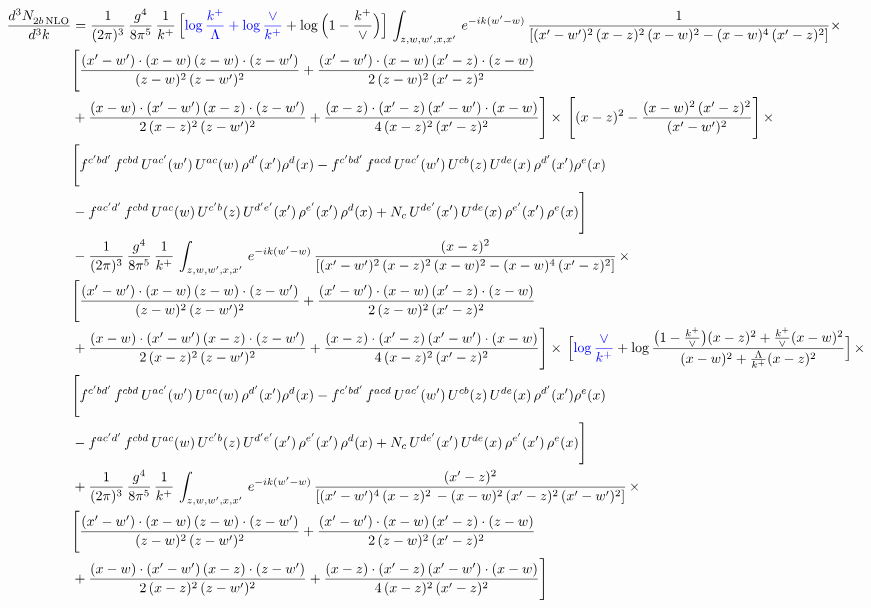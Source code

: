 \documentclass[9pt]{article}
\numberwithin{equation}{section}
\begin{document}
\begin{align} 
    \frac{d^{3}N_{2b\,\rm NLO}^{\rm}}{d^{3}k}  & = \frac{1}{(2\pi)^{3}}\, \frac{g^{4}}{8\pi^{5}}\,\frac{1}{k^{+}}\,\Big[{\color{blue}\log\frac{k^{+}}{\Lambda}+\log\frac{\vee}{k^{+}}}+\log\Big(1-\frac{k^{+}}{\vee}\Big)\Big]\,\int_{z,w,w^{\prime},x,x'}\, e^{-ik(w^{\prime}-w)}\, \frac{1}{\left[(x'-w')^{2}\,(x-z)^{2}\,(x-w)^{2} - (x-w)^{4}\, (x'-z)^{2}\right]} \times\notag \\ & \Bigg[\frac{(x'-w')\cdot (x-w)\, (z-w)\cdot (z-w')}{(z-w)^{2}\, (z-w')^{2}}+\frac{(x'-w')\cdot (x-w)\, (x'-z)\cdot (z-w)}{2\, (z-w)^{2}\, (x'-z)^{2}}\notag \\ & +\frac{(x-w)\cdot (x'-w')\, (x-z)\cdot (z-w')}{2\, (x-z)^{2}\, (z-w')^{2}}+\frac{(x-z)\cdot (x'-z)\, (x'-w')\cdot (x-w)}{4\, (x-z)^{2}\, (x'-z)^{2}}\Bigg] \times\,\Bigg[(x-z)^{2} - \frac{(x-w)^{2}\, (x'-z)^{2}}{(x'-w')^{2}}\Bigg]\,\times \notag \\ & \Bigg[f^{c'bd'}\,f^{cbd}\, U^{ac'}(w')\,U^{ac}(w)\,\rho^{d'}(x')\rho^{d}(x)- f^{c'bd'}\,f^{acd}\,U^{ac'}(w')\,U^{cb}(z)\,U^{de}(x)\,\rho^{d'}(x')\rho^{e}(x) \notag \\ & -f^{ac'd'}\,f^{cbd}\,U^{ac}(w)\,U^{c'b}(z)\,U^{d'e'}(x')\,\rho^{e'}(x')\,\rho^{d}(x) +N_{c}\,U^{de'}(x')\,U^{de}(x)\,\rho^{e'}(x')\,\rho^{e}(x)\Bigg]\notag \\ &  - \frac{1}{(2\pi)^{3}}\, \frac{g^{4}}{8\pi^{5}}\,\frac{1}{k^{+}}\,\int_{z,w,w^{\prime},x,x'}\, e^{-ik(w^{\prime}-w)}\, \frac{(x-z)^{2}}{\left[(x'-w')^{2}\,(x-z)^{2}\,(x-w)^{2} - (x-w)^{4}\, (x'-z)^{2}\right]}\,  \times\notag \\ & \Bigg[\frac{(x'-w')\cdot (x-w)\, (z-w)\cdot (z-w')}{(z-w)^{2}\, (z-w')^{2}}+\frac{(x'-w')\cdot (x-w)\, (x'-z)\cdot (z-w)}{2\, (z-w)^{2}\, (x'-z)^{2}}\notag \\ & +\frac{(x-w)\cdot (x'-w')\, (x-z)\cdot (z-w')}{2\, (x-z)^{2}\, (z-w')^{2}}+\frac{(x-z)\cdot (x'-z)\, (x'-w')\cdot (x-w)}{4\, (x-z)^{2}\, (x'-z)^{2}}\Bigg] \times\,\Big[{\color{blue}\log\frac{\vee}{k^{+}}}+\log\frac{\big(1-\frac{k^{+}}{\vee}\big)(x-z)^{2}+\frac{k^{+}}{\vee}(x-w)^{2}}{(x-w)^{2}+\frac{\Lambda}{k^{+}}(x-z)^{2}}\Big]\,\times \notag \\ & \Bigg[f^{c'bd'}\,f^{cbd}\, U^{ac'}(w')\,U^{ac}(w)\,\rho^{d'}(x')\rho^{d}(x)- f^{c'bd'}\,f^{acd}\,U^{ac'}(w')\,U^{cb}(z)\,U^{de}(x)\,\rho^{d'}(x')\rho^{e}(x) \notag \\ & -f^{ac'd'}\,f^{cbd}\,U^{ac}(w)\,U^{c'b}(z)\,U^{d'e'}(x')\,\rho^{e'}(x')\,\rho^{d}(x) +N_{c}\,U^{de'}(x')\,U^{de}(x)\,\rho^{e'}(x')\,\rho^{e}(x)\Bigg]\notag \\ &  + \frac{1}{(2\pi)^{3}}\, \frac{g^{4}}{8\pi^{5}}\,\frac{1}{k^{+}}\,\int_{z,w,w^{\prime},x,x'}\, e^{-ik(w^{\prime}-w)}\, \frac{(x'-z)^{2}}{\left[(x'-w')^{4}\,(x-z)^{2}\, - (x-w)^{2}\, (x'-z)^{2}\,(x'-w')^{2}\right]}\,  \times\notag \\ & \Bigg[\frac{(x'-w')\cdot (x-w)\, (z-w)\cdot (z-w')}{(z-w)^{2}\, (z-w')^{2}}+\frac{(x'-w')\cdot (x-w)\, (x'-z)\cdot (z-w)}{2\, (z-w)^{2}\, (x'-z)^{2}}\notag \\ & +\frac{(x-w)\cdot (x'-w')\, (x-z)\cdot (z-w')}{2\, (x-z)^{2}\, (z-w')^{2}}+\frac{(x-z)\cdot (x'-z)\, (x'-w')\cdot (x-w)}{4\, (x-z)^{2}\, (x'-z)^{2}}\Bigg] 
\end{align}
\end{document}
